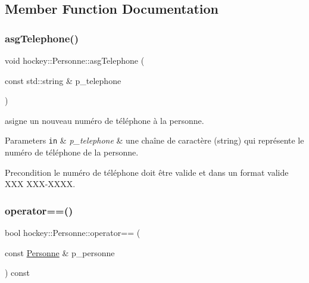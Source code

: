 \subsection{Member Function Documentation}
\mbox{\label{classhockey_1_1Personne_a82838fb8c45d908b64396e14787f4d52}} 
\subsubsection{\texorpdfstring{asg\+Telephone()}{asgTelephone()}}
{\footnotesize\ttfamily void hockey\+::\+Personne\+::asg\+Telephone (\begin{DoxyParamCaption}\item[{const std\+::string \&}]{p\+\_\+telephone }\end{DoxyParamCaption})}



asigne un nouveau numéro de téléphone à la personne. 


\begin{DoxyParams}[1]{Parameters}
\mbox{\tt in}  & {\em p\+\_\+telephone} & une chaîne de caractère (string) qui représente le numéro de téléphone de la personne. \\
\hline
\end{DoxyParams}
\begin{DoxyPrecond}{Precondition}
le numéro de téléphone doit être valide et dans un format valide X\+XX X\+X\+X-\/\+X\+X\+XX. 
\end{DoxyPrecond}
\mbox{\label{classhockey_1_1Personne_a5a519977d574d18b919eb39e6cfbf62b}} 
\subsubsection{\texorpdfstring{operator==()}{operator==()}}
{\footnotesize\ttfamily bool hockey\+::\+Personne\+::operator== (\begin{DoxyParamCaption}\item[{const \hyperlink{classhockey_1_1Personne}{Personne} \&}]{p\+\_\+personne }\end{DoxyParamCaption}) const}



